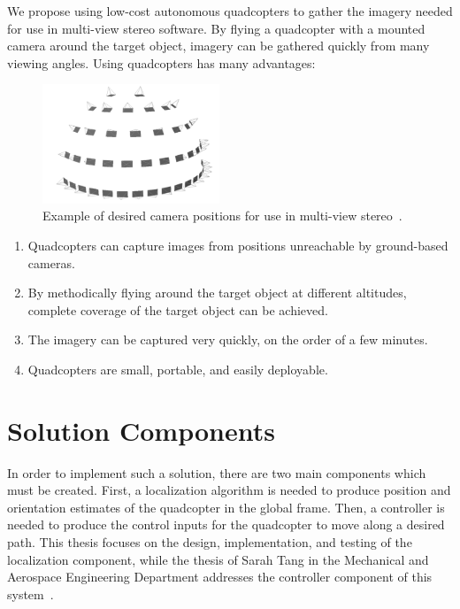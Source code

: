 We propose using low-cost autonomous quadcopters to gather the imagery needed for use in multi-view stereo software. By flying a quadcopter with a mounted camera around the target object, imagery can be gathered quickly from many viewing angles. Using quadcopters has many advantages:

\begin{figure}
\centering
\includegraphics[width=200px]{../images/camera_network.png}
\caption{Example of desired camera positions for use in multi-view stereo~\cite{Irschara}.}
\end{figure}

\begin{enumerate}
\item
Quadcopters can capture images from positions unreachable by ground-based cameras.

\item
By methodically flying around the target object at different altitudes, complete coverage of the target object can be achieved.

\item
The imagery can be captured very quickly, on the order of a few minutes.

\item
Quadcopters are small, portable, and easily deployable.


\end{enumerate}

\section{Solution Components}

In order to implement such a solution, there are two main components which must be created. First, a localization algorithm is needed to produce position and orientation estimates of the quadcopter in the global frame. Then, a controller is needed to produce the control inputs for the quadcopter to move along a desired path. This thesis focuses on the design, implementation, and testing of the localization component, while the thesis of Sarah Tang in the Mechanical and Aerospace Engineering Department addresses the controller component of this system~\cite{Tang}.






